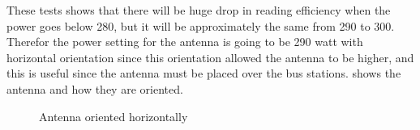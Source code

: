 \documentclass[a4paper,twoside]{IEEEtran}
\begin{document}
These tests shows that there will be huge drop in reading efficiency when the power goes below 280, but it will be approximately the same from 290 to 300. Therefor the power setting for the antenna is going to be 290 watt with horizontal orientation since this orientation allowed the antenna to be higher, and this is useful since the antenna must be placed over the bus stations.  shows the antenna and how they are oriented.
\begin{figure}[h]
\centering
{}
\caption{Antenna oriented horizontally}
\label{antenna}
\end{figure}
\end{document}
